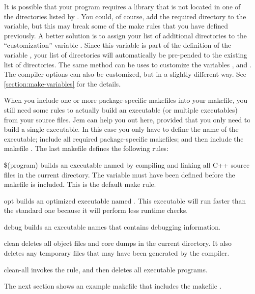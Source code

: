 \documentclass[a4paper,10pt]{article}
\begin{document}
It is possible that your program requires a library that is not located
in one of the directories listed by . You could, of
course, add the required directory to the  variable, but
this may break some of the make rules that you have defined previously.
A better solution is to assign your list of additional directories to the
``customization'' variable . Since this variable is part
of the definition of the variable , your list of
directories will automatically be pre-pended to the existing list of
directories. The same method can be uses to customize the variables
,  and . The compiler
options can also be customized, but in a slightly different way. See
\autoref{section:make-variables} for the details.

When you include one or more package-specific makefiles into your
makefile, you still need some rules to actually build an executable (or
multiple executables) from your source files. Jem can help you out here,
provided that you only need to build a single executable. In this case
you only have to define the name of the executable; include all required
package-specific makefiles; and then include the makefile
. The last makefile defines the
following rules:
\begin{Description}[\Code]

\item[\$(program)] builds an executable named  by
  compiling and linking all C++ source files in the current directory.
  The variable  must have been defined before the makefile
   is included. This is the default
  make rule.

\item[opt] builds an optimized executable named
  . This executable will run faster than the
  standard one because it will perform less runtime checks.

\item[debug] builds an executable names  that
  contains debugging information.

\item[clean] deletes all object files and core dumps in the current
  directory. It also deletes any temporary files that may have been
  generated by the compiler.

\item[clean-all] invokes the  rule, and then deletes all
  executable programs.

\end{Description}
The next section shows an example makefile that includes the makefile
.
\end{document}
